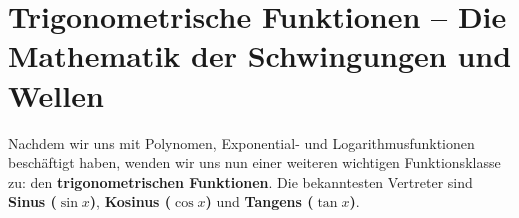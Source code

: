 
\section{Trigonometrische Funktionen – Die Mathematik der Schwingungen und Wellen}
\label{sec:trigonometrische_funktionen}

Nachdem wir uns mit Polynomen, Exponential- und Logarithmusfunktionen beschäftigt haben, wenden wir uns nun einer weiteren wichtigen Funktionsklasse zu: den \textbf{trigonometrischen Funktionen}. Die bekanntesten Vertreter sind \textbf{Sinus ($\sin x$)}, \textbf{Kosinus ($\cos x$)} und \textbf{Tangens ($\tan x$)}.

